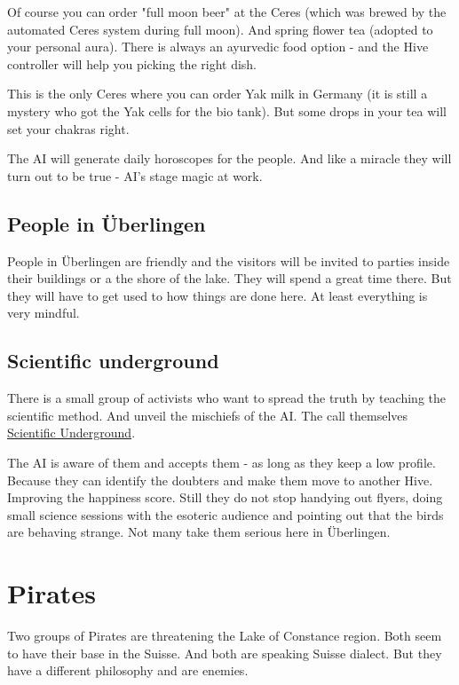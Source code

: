 Of course you can order "full moon beer" at the Ceres (which was brewed by the automated Ceres system during full moon). And spring flower tea (adopted to your personal aura). There is always an ayurvedic food option - and the Hive controller will help you picking the right dish.

This is the only Ceres where you can order Yak milk in Germany (it is still a mystery who got the Yak cells for the bio tank). But some drops in your tea will set your chakras right.

The AI will generate daily horoscopes for the people. And like a miracle they will turn out to be true - AI's stage magic at work.

\subsection{People in Überlingen}

People in Überlingen are friendly and the visitors will be invited to parties inside their buildings or a the shore of the lake. They will spend a great time there. But they will have to get used to how things are done here. At least everything is very mindful.


\subsection{Scientific underground}

There is a small group of activists who want to spread the truth by teaching the scientific method. And unveil the mischiefs of the AI. The call themselves \hyperref[sec:Scientific Underground]{Scientific Underground}.


The AI is aware of them and accepts them - as long as they keep a low profile. Because they can identify the doubters and make them move to another Hive. Improving the happiness score.
Still they do not stop handying out flyers, doing small science sessions with the esoteric audience and pointing out that the birds are behaving strange. Not many take them serious here in Überlingen.

\section{Pirates}

Two groups of Pirates are threatening the Lake of Constance region. Both seem to have their base in the Suisse. And both are speaking Suisse dialect. But they have a different philosophy and are enemies.

